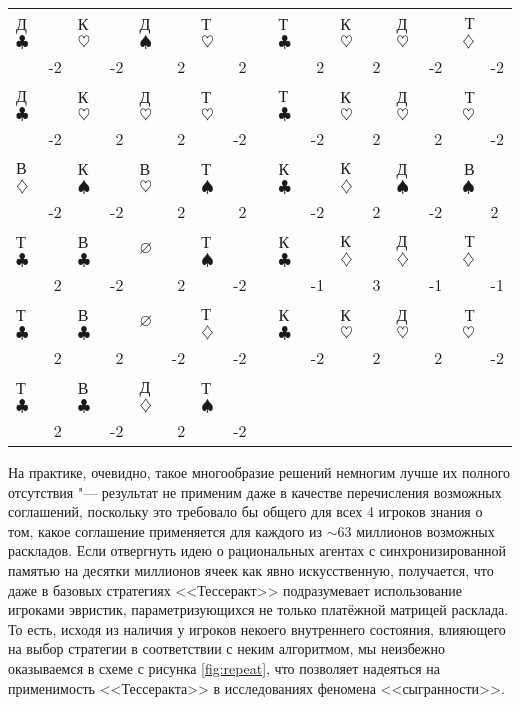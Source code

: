 \begin{table}[htbp]
\begin{SingleSpace}
\begin{tabular}{|LR|LR|LR|LR|c|LR|LR|LR|RL|}
			Д$\clubsuit$ & & К$\heartsuit$ & & Д$\spadesuit$ & & Т$\heartsuit$ & & & Т$\clubsuit$ & & К$\heartsuit$ & & Д$\heartsuit$ & & Т$\diamondsuit$ & \\
			& -2 & & -2 & & 2 & & 2 & & & 2 & & 2 & & -2 & & -2 \\
			 
			Д$\clubsuit$ & & К$\heartsuit$ & & Д$\heartsuit$ & & Т$\heartsuit$ & & & Т$\clubsuit$ & & К$\heartsuit$ & & Д$\heartsuit$ & & Т$\heartsuit$ & \\
			& -2 & & 2 & & 2 & & -2 & & & -2 & & 2 & & 2 & & -2 \\
			 
			В$\diamondsuit$ & & К$\spadesuit$ & & В$\heartsuit$ & & Т$\spadesuit$ & & & К$\clubsuit$ & & К$\diamondsuit$ & & Д$\spadesuit$ & & В$\spadesuit$ & \\
			& -2 & & -2 & & 2 & & 2 & & & -2 & & 2 & & -2 & & 2 \\
			 
			Т$\clubsuit$ & & В$\clubsuit$ & & $\varnothing$ & & Т$\spadesuit$ & & & К$\clubsuit$ & & К$\diamondsuit$ & & Д$\diamondsuit$ & & Т$\diamondsuit$ & \\
			& 2 & & -2 & & 2 & & -2 & & & -1 & & 3 & & -1 & & -1 \\
			 
			Т$\clubsuit$ & & В$\clubsuit$ & & $\varnothing$ & & Т$\diamondsuit$ & & & К$\clubsuit$ & & К$\heartsuit$ & & Д$\heartsuit$ & & Т$\heartsuit$ & \\
			& 2 & & 2 & & -2 & & -2 & & & -2 & & 2 & & 2 & & -2 \\
			 
			Т$\clubsuit$ & & В$\clubsuit$ & & Д$\diamondsuit$ & & Т$\spadesuit$ & \\
			& 2 & & -2 & & 2 & & -2 \\
		\end{tabular}
	\end{SingleSpace}
\end{table}

На практике, очевидно, такое многообразие решений немногим лучше их полного отсутствия "--- результат не применим даже в качестве перечисления возможных соглашений, поскольку это требовало бы общего для всех 4 игроков знания о том, какое соглашение применяется для каждого из $\sim 63$ миллионов возможных раскладов. Если отвергнуть идею о рациональных агентах с синхронизированной памятью на десятки миллионов ячеек как явно искусственную, получается, что даже в базовых стратегиях <<Тессеракт>> подразумевает использование игроками эвристик, параметризующихся не только платёжной матрицей расклада. То есть, исходя из наличия у игроков некоего внутреннего состояния, влияющего на выбор стратегии в соответствии с неким алгоритмом, мы неизбежно оказываемся в схеме с рисунка \ref{fig:repeat}, что позволяет надеяться на применимость <<Тессеракта>> в исследованиях феномена <<сыгранности>>.

